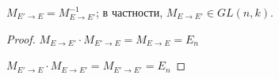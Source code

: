 \follow $M_{E' \to E} = M_{E \to E'}^{-1}$; в частности, $M_{E \to E'} \in GL(n, k)$.

\begin{proof}
        
    $M_{E \to E'} \cdot M_{E' \to E} = M_{E \to E} = E_n$

    $M_{E' \to E} \cdot M_{E \to E'} = M_{E' \to E'} = E_n$
\end{proof}

